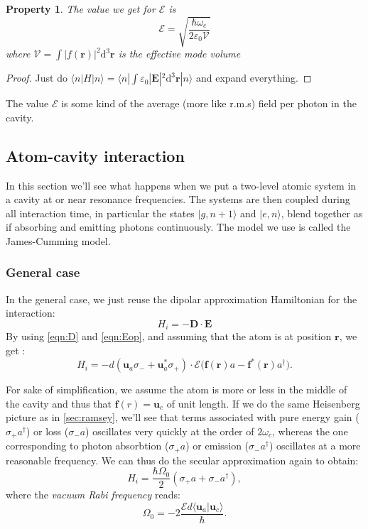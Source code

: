 \documentclass[10pt,a4paper]{report}
\theoremstyle{plain}
\newtheorem{prop}[thm]{Property}
\theoremstyle{definition}
\theoremstyle{remark}
\newcommand{\ket}[1]{|#1\rangle}
\newcommand{\bra}[1]{\langle#1|}
\newcommand{\braket}[2]{\langle#1|#2\rangle}
\newcommand{\dd}{\mathrm{d}}
\newcommand{\bs}{\boldsymbol}
\begin{document}
\begin{prop}
  The value we get for $\mathcal{E}$ is
\[ \mathcal{E} = \sqrt{\frac{\hbar \omega_c}{2 \varepsilon_0 \mathcal{V}}}\]
where $\mathcal{V} = \int \bs |f(\bs r)|^2\dd^3\bs r$ is the effective mode volume
\end{prop}

\begin{proof}
  Just do $\bra n H \ket n = \bra n \int \varepsilon_0 |{\bs E}|^2 \dd^3 \bs r
  \ket n$ and expand everything.
\end{proof}

The value $\mathcal{E}$ is some kind of the average (more like r.m.s) field per
photon in the cavity.

\subsection{Atom-cavity interaction}\label{sec:atomcav}


In this section we'll see what happens when we put a two-level atomic system in
a cavity at or near resonance frequencies. The systems are then coupled during
all interaction time, in particular the states $\ket{g,n+1}$ and $\ket{e,n}$,
blend together as if absorbing and emitting photons continuously. The model we
use is called the James-Cumming model.

\subsubsection{General case}

In the general case, we just reuse the dipolar approximation Hamiltonian for the
interaction:
\[H_i = - \bs D \cdot \bs E\]
By using \cref{eqn:D} and \cref{eqn:Eop}, and assuming that the atom is at
position $\bs r$, we get :
\[H_i = - d(\bs u_a \sigma_- + \bs u_a^* \sigma_+) \cdot \mathcal{E}\big(\bs
  f(\bs r) a - \bs f^*(\bs r)
  a^\dagger \big).
  \]


For sake of simplification, we assume the atom is more or less in the middle
of the cavity and thus that $\bs f(r) = \bs u_c$ of unit length.
If we do the same Heisenberg picture as in \cref{sec:ramsey}, we'll see that
terms associated with pure energy gain ($\sigma_+a^\dagger$) or loss ($\sigma_-a$)
oscillates very quickly at the order of $2\omega_c$,
whereas the one corresponding to photon absorbtion ($\sigma_+a$) or emission
($\sigma_-a^\dagger$) oscillates at a more reasonable frequency. We can
thus do the secular approximation again to obtain:
\begin{equation}
  H_i = \frac{\hbar \Omega_0}2 (\sigma_+a + \sigma_-a^\dagger),
\end{equation}
where the \emph{vacuum Rabi frequency} reads:
\[\Omega_0 = -2\frac {\mathcal{E}d \braket{\bs u_a}{\bs u_c}}{\hbar}.\]
\end{document}
